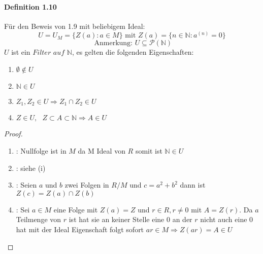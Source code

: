 \documentclass[a4paper]{article}
\begin{document}
\paragraph{Definition 1.10}  Für den Beweis von 1.9 mit beliebigem Ideal: 
$$ U = U_M = \{Z(a): a \in M\} \text{ mit } Z(a) = \{n \in \mathbb{N}: a^{(n)} = 0\}$$
$$ \text{ Anmerkung: } U \subseteq \mathcal{P}(\mathbb{N}) $$
$U $ ist ein $\textit{Filter auf } \mathbb{N} $, es gelten die folgenden Eigenschaften: 
\begin{enumerate}
      \item $ \emptyset \notin U $      
      \item $ \mathbb{N} \in U$ 
      \item $ Z_1, Z_2 \in U \Rightarrow Z_1 \cap Z_2 \in U$ 
      \item $ Z \in U, \text{ } Z \subset A \subset \mathbb{N} \Rightarrow A \in U$ 
\end{enumerate}


\begin{proof} $ \text{ } $
      \newpage
\begin{enumerate}
     \item: Nullfolge ist in $ M $ da M Ideal von $ R $ somit ist $ \mathbb{N} \in U $ 
     \item: siehe (i)  
     \item: Seien $ a $ und $ b $ zwei Folgen in $ R/M $ und $ c = a^2 + b^2 $   
            dann ist $ Z(c) = Z(a) \cap Z(b) $
     \item: Sei $ a \in M $ eine Folge mit $ Z(a) = Z $ und $ r \in R, r \neq 0 $ mit $ A = Z(r) $. 
            Da $ a $ Teilmenge von $ r $ ist hat sie an keiner Stelle eine $ 0 $ an der $ r $ nicht auch eine $ 0 $ hat 
            mit der Ideal Eigenschaft folgt sofort $ ar \in M \Rightarrow Z(ar) = A \in U $  
\end{enumerate}
\end{proof}
\end{document}
